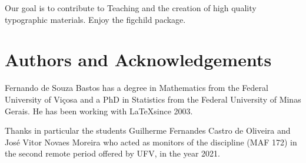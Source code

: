 \documentclass{article}
\begin{document}
Our goal is to contribute to Teaching and the creation of high quality typographic materials. Enjoy the figchild package.


\section{Authors and Acknowledgements}

\hspace{\parindent}Fernando de Souza Bastos has a degree in Mathematics from the Federal University of Viçosa and a PhD in Statistics from the Federal University of Minas Gerais. He has been working with \LaTeX since 2003.

Thanks in particular the students Guilherme Fernandes Castro de Oliveira and José Vitor Novaes Moreira who acted as monitors of the discipline (MAF 172) in the second remote period offered by UFV, in the year 2021.


\end{document}
